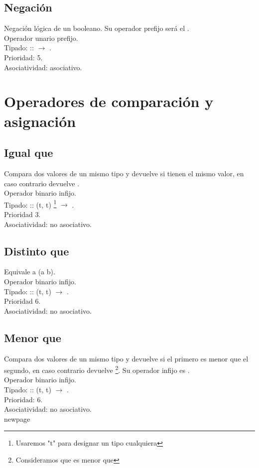 \subsection*{Negación}
Negación lógica de un booleano. Su operador prefijo será el \Not. 
\\Operador  unario prefijo.
\\Tipado: \Not :: \Boolean $\rightarrow$ \Boolean. \\Prioridad: 5.
\\Asociatividad: asociativo.


\section{Operadores de comparación y asignación}

\subsection*{Igual que}
Compara dos valores de un mismo tipo y devuelve  si tienen el mismo valor, en caso contrario devuelve . 
\\Operador  binario infijo.
\\Tipado: \Eq :: (t, t)
\footnote{Usaremos "t" para designar un tipo cualquiera} $\rightarrow$ \Boolean. \\Prioridad 3.
\\Asociatividad: no asociativo.

\subsection*{Distinto que}
Equivale a \Not (a \Eq b). 
\\Operador  binario infijo.
\\Tipado: \operator{=/=} :: (t, t)  $\rightarrow$ \Boolean.
\\Prioridad 6.
\\Asociatividad: no asociativo.

\subsection*{Menor que}
Compara dos valores de un mismo tipo y devuelve  si el primero es menor que el segundo, en caso contrario devuelve 
\footnote{Consideramos que   es menor que }. Su operador infijo es \Lt. 
\\Operador  binario infijo.
\\Tipado: \Lt :: (t, t) $\rightarrow$ \Boolean. \\Prioridad: 6.
\\Asociatividad: no asociativo.
\\newpage
